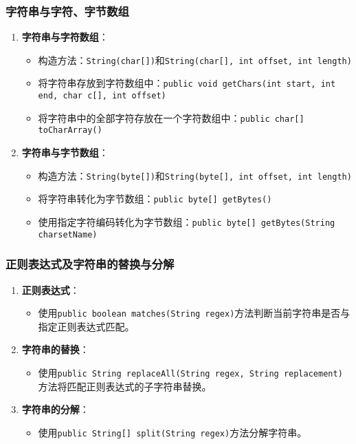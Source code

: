 \documentclass[a4paper, 10pt]{ctexart}
\begin{document}
\subsubsection{字符串与字符、字节数组}
\begin{enumerate}
  \item \textbf{字符串与字符数组}：
  \begin{itemize}
    \item 构造方法：\texttt{String(char[])}和\texttt{String(char[], int offset, int length)}
    \item 将字符串存放到字符数组中：\texttt{public void getChars(int start, int end, char c[], int offset)}
    \item 将字符串中的全部字符存放在一个字符数组中：\texttt{public char[] toCharArray()}
  \end{itemize}
  \item \textbf{字符串与字节数组}：
  \begin{itemize}
    \item 构造方法：\texttt{String(byte[])}和\texttt{String(byte[], int offset, int length)}
    \item 将字符串转化为字节数组：\texttt{public byte[] getBytes()}
    \item 使用指定字符编码转化为字节数组：\texttt{public byte[] getBytes(String charsetName)}
  \end{itemize}
\end{enumerate}

\subsubsection{正则表达式及字符串的替换与分解}
\begin{enumerate}
  \item \textbf{正则表达式}：
  \begin{itemize}
    \item 使用\texttt{public boolean matches(String regex)}方法判断当前字符串是否与指定正则表达式匹配。
  \end{itemize}
  \item \textbf{字符串的替换}：
  \begin{itemize}
    \item 使用\texttt{public String replaceAll(String regex, String replacement)}方法将匹配正则表达式的子字符串替换。
  \end{itemize}
  \item \textbf{字符串的分解}：
  \begin{itemize}
    \item 使用\texttt{public String[] split(String regex)}方法分解字符串。
  \end{itemize}
\end{enumerate}
\end{document}

